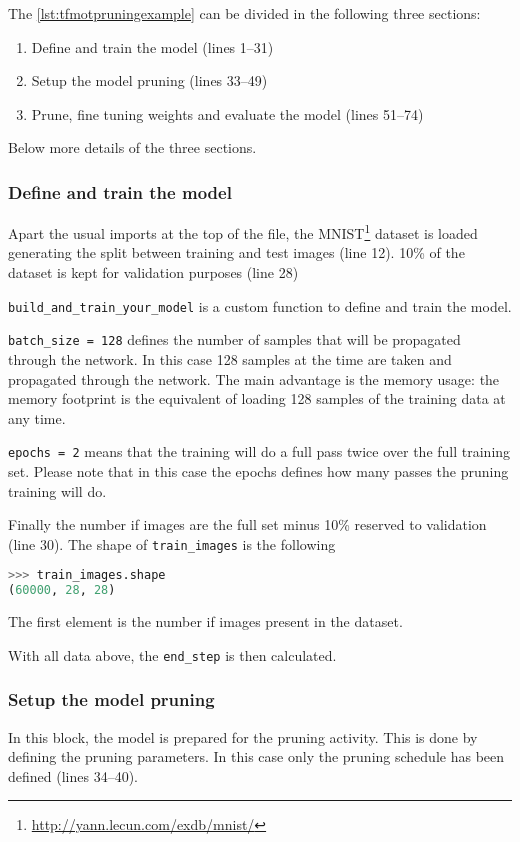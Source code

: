 The \autoref{lst:tfmotpruningexample} can be divided in the following three
sections:

\begin{enumerate}
    \item Define and train the model (lines 1--31)
    \item Setup the model pruning (lines 33--49)
    \item Prune, fine tuning weights and evaluate the model (lines 51--74)
\end{enumerate}

Below more details of the three sections.

\subsubsection{Define and train the model}
Apart the usual imports at the top of the file, the
MNIST\footnote{\url{http://yann.lecun.com/exdb/mnist/}} dataset is loaded
generating the split between training and test images (line 12).
10\% of the dataset is kept for validation purposes (line 28)

\texttt{build\_and\_train\_your\_model} is a custom function to define and
train the model.

\texttt{batch\_size = 128} defines the number of samples that will be
propagated through the network. In this case 128 samples at the time are taken
and propagated through the network.
The main advantage is the memory usage: the memory footprint is the equivalent
of loading 128 samples of the training data at any time.

\texttt{epochs = 2} means that the training will do a full pass twice over the
full training set. Please note that in this case the epochs defines how many
passes the pruning training will do.

Finally the number if images are the full set minus 10\% reserved to
validation (line 30). The shape of \texttt{train\_images} is the following

\begin{lstlisting}[language=Python, caption=Shape of train\_images]
>>> train_images.shape
(60000, 28, 28)
\end{lstlisting}

The first element is the number if images present in the dataset.

With all data above, the \texttt{end\_step} is then calculated.

\subsubsection{Setup the model pruning}
In this block, the model is prepared for the pruning activity.
This is done by defining the pruning parameters. In this case only the pruning
schedule has been defined (lines 34--40).

